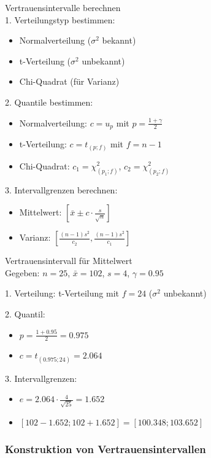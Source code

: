 \begin{KR}{Vertrauensintervalle berechnen}\\
1. Verteilungstyp bestimmen:
   \begin{itemize}
     \item Normalverteilung ($\sigma^2$ bekannt)
     \item t-Verteilung ($\sigma^2$ unbekannt)
     \item Chi-Quadrat (für Varianz)
   \end{itemize}

2. Quantile bestimmen:
   \begin{itemize}
     \item Normalverteilung: $c=u_p$ mit $p=\frac{1+\gamma}{2}$
     \item t-Verteilung: $c=t_{(p;f)}$ mit $f=n-1$
     \item Chi-Quadrat: $c_1=\chi^2_{(p_1;f)}$, $c_2=\chi^2_{(p_2;f)}$
   \end{itemize}

3. Intervallgrenzen berechnen:
   \begin{itemize}
     \item Mittelwert: $[\bar{x} \pm c \cdot \frac{s}{\sqrt{n}}]$
     \item Varianz: $[\frac{(n-1)s^2}{c_2}, \frac{(n-1)s^2}{c_1}]$
   \end{itemize}
\end{KR}

\begin{example2}{Vertrauensintervall für Mittelwert}\\
Gegeben: $n=25$, $\bar{x}=102$, $s=4$, $\gamma=0.95$

1. Verteilung: t-Verteilung mit $f=24$ ($\sigma^2$ unbekannt)

2. Quantil:
   \begin{itemize}
     \item $p=\frac{1+0.95}{2}=0.975$
     \item $c=t_{(0.975;24)}=2.064$
   \end{itemize}

3. Intervallgrenzen:
   \begin{itemize}
     \item $e=2.064 \cdot \frac{4}{\sqrt{25}}=1.652$
     \item $[102-1.652; 102+1.652]=[100.348; 103.652]$
   \end{itemize}
\end{example2}

\subsubsection{Konstruktion von Vertrauensintervallen}

